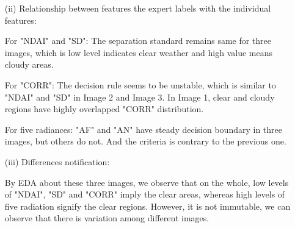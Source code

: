 \documentclass[11pt]{article}
\begin{document}
\begin{enumerate}[label=(\alph*)]
\begin{enumerate}
\item[(ii)] Relationship between features the expert labels with the individual features:\par
\quad For "NDAI" and "SD": The separation standard remains same for three images, which is low level indicates clear weather and high value means cloudy areas.\par
\quad For "CORR": The decision rule seems to be unstable, which is similar to "NDAI" and "SD" in Image 2 and Image 3. In Image 1, clear and cloudy regions have highly overlapped "CORR" distribution.\par
\quad For five radiances: "AF" and "AN" have steady decision boundary in three images, but others do not. And the criteria is contrary to the previous one.

\item[(iii)] Differences notification:\par
\quad By EDA about these three images, we observe that on the whole, low levels of "NDAI", "SD" and "CORR" imply the clear areas, whereas high levels of five radiation signify the clear regions. However, it is not immutable, we can observe that there is variation among different images.
\end{enumerate}

\end{enumerate}
\end{document}
